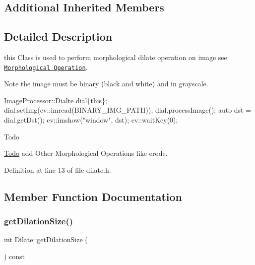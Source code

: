 \subsection*{Additional Inherited Members}


\subsection{Detailed Description}
this Class is used to perform morphological dilate operation on image see \href{https://docs.opencv.org/trunk/d9/d61/tutorial_py_morphological_ops.html}{\tt Morphological Operation}. 

\begin{DoxyNote}{Note}
the image must be binary (black and white) and in grayscale.
\end{DoxyNote}

\begin{DoxyCode}
 ImageProcessor::Dialte dial\{\textcolor{keyword}{this}\};
dial.setImg(cv::imread(BINARY\_IMG\_PATH));
dial.processImage();
\textcolor{keyword}{auto} dst = dial.getDst();
cv::imshow(\textcolor{stringliteral}{"window"}, dst);
cv::waitKey(0);
\end{DoxyCode}


\begin{DoxyRefDesc}{Todo}
\item[\hyperlink{todo__todo000003}{Todo}]add Other Morphological Operations like erode. \end{DoxyRefDesc}


Definition at line 13 of file dilate.\+h.



\subsection{Member Function Documentation}
\mbox{\label{class_image_processor_1_1_dilate_a52a32329eb187040162c980d72544828}} 
\subsubsection{\texorpdfstring{get\+Dilation\+Size()}{getDilationSize()}}
{\footnotesize\ttfamily int Dilate\+::get\+Dilation\+Size (\begin{DoxyParamCaption}{ }\end{DoxyParamCaption}) const}



